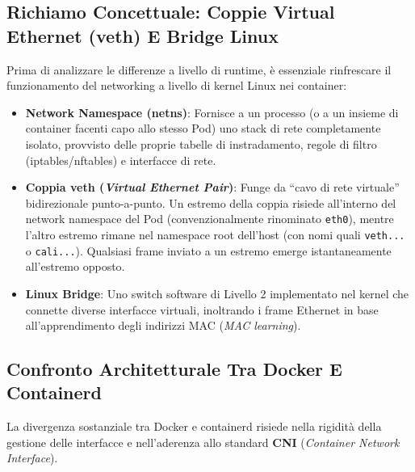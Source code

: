 \documentclass[11pt, a4paper]{article}
\begin{document}
\subsection{Richiamo Concettuale: Coppie Virtual Ethernet (veth) E Bridge Linux}
Prima di analizzare le differenze a livello di runtime, è essenziale rinfrescare il funzionamento del networking a livello di kernel Linux nei container:
\begin{itemize}[noitemsep]
    \item \textbf{Network Namespace (netns)}: Fornisce a un processo (o a un insieme di container facenti capo allo stesso Pod) uno stack di rete completamente isolato, provvisto delle proprie tabelle di instradamento, regole di filtro (iptables/nftables) e interfacce di rete.
    \item \textbf{Coppia veth (\emph{Virtual Ethernet Pair})}: Funge da ``cavo di rete virtuale'' bidirezionale punto-a-punto. Un estremo della coppia risiede all'interno del network namespace del Pod (convenzionalmente rinominato \texttt{eth0}), mentre l'altro estremo rimane nel namespace root dell'host (con nomi quali \texttt{veth...} o \texttt{cali...}). Qualsiasi frame inviato a un estremo emerge istantaneamente all'estremo opposto.
    \item \textbf{Linux Bridge}: Uno switch software di Livello 2 implementato nel kernel che connette diverse interfacce virtuali, inoltrando i frame Ethernet in base all'apprendimento degli indirizzi MAC (\emph{MAC learning}).
\end{itemize}

\subsection{Confronto Architetturale Tra Docker E Containerd}
La divergenza sostanziale tra Docker e containerd risiede nella rigidità della gestione delle interfacce e nell'aderenza allo standard \textbf{CNI} (\emph{Container Network Interface}).

\end{document}
